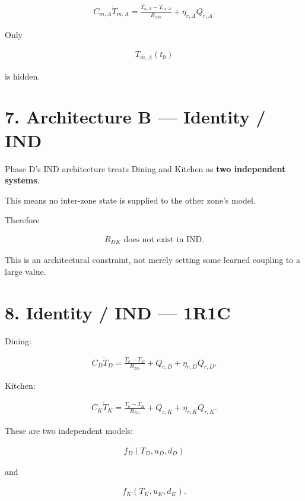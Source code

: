 \documentclass[11pt]{article}
\begin{document}
\begin{align}
\boxed{
C_{m,A}\dot T_{m,A}
=
\frac{T_{a,A}-T_{m,A}}{R_{Am}}
+
\eta_{r,A}Q_{r,A}.
}
\tag{17}
\end{align}

Only

\begin{align}
T_{m,A}(t_0)
\end{align}

is hidden.

\section*{7. Architecture B --- Identity / IND}

Phase D's IND architecture treats Dining and Kitchen as \textbf{two independent systems}.

This means no inter-zone state is supplied to the other zone's model.

Therefore

\begin{align}
\boxed{R_{DK}\text{ does not exist in IND}.}
\end{align}

This is an architectural constraint, not merely setting some learned coupling to a large value.

\section*{8. Identity / IND --- 1R1C}

Dining:

\begin{align}
\boxed{
C_D\dot T_D
=
\frac{T_o-T_D}{R_{Do}}
+
Q_{c,D}
+
\eta_{r,D}Q_{r,D}.
}
\tag{18}
\end{align}

Kitchen:

\begin{align}
\boxed{
C_K\dot T_K
=
\frac{T_o-T_K}{R_{Ko}}
+
Q_{c,K}
+
\eta_{r,K}Q_{r,K}.
}
\tag{19}
\end{align}

These are two independent models:

\begin{align}
f_D(T_D,u_D,d_D)
\end{align}

and

\begin{align}
f_K(T_K,u_K,d_K).
\end{align}
\end{document}
